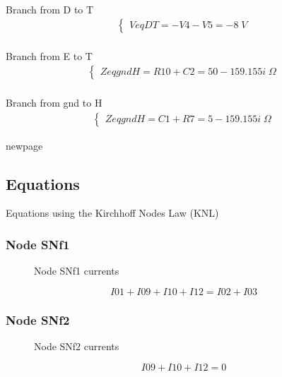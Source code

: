 \documentclass[a4paper]{article}
\begin{document}
\paragraph{} Branch from D to T
\begin{gather*}
\begin{cases}
VeqDT =  - V4 - V5 = -8\;V
\end{cases}
\end{gather*}
\par

\paragraph{} Branch from E to T
\begin{gather*}
\begin{cases}
ZeqgndH = R10 + C2  = 50 - 159.155i\;\Omega
\end{cases}
\end{gather*}
\par

\paragraph{} Branch from gnd to H
\begin{gather*}
\begin{cases}
ZeqgndH = C1 + R7  = 5 - 159.155i\;\Omega
\end{cases}
\end{gather*}
\par
newpage
\subsection{Equations}
Equations using the Kirchhoff Nodes Law (KNL)

\subsubsection{Node SNf1}
\begin{figure}[hbt]
\caption{Node SNf1 currents}
\label{snf1currents}
\end{figure}
\begin{equation}
  I01+I09+I10+I12=I02+I03
\end{equation}

\subsubsection{Node SNf2}
\begin{figure}[hbt]
\caption{Node SNf2 currents}

\label{snf2currents}
\end{figure}
\begin{equation}
  I09+I10+I12=0
\end{equation}
\end{document}
